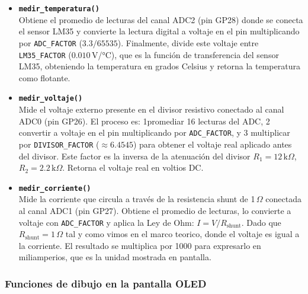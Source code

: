 \documentclass[letterpaper,12pt]{article}
\begin{document}
    \begin{itemize}
        \item \textbf{\texttt{medir\_temperatura()}} \\
        Obtiene el promedio de lecturas del canal ADC2 (pin GP28) donde se conecta el sensor LM35 y convierte la lectura digital a voltaje en el pin multiplicando por \texttt{ADC\_FACTOR} ($3.3/65535$). Finalmente, divide este voltaje entre \texttt{LM35\_FACTOR} ($0.010$\,V/°C), que es la función de transferencia del sensor LM35, obteniendo la temperatura en grados Celsius y retorna la temperatura como flotante.

        \item \textbf{\texttt{medir\_voltaje()}} \\
        Mide el voltaje externo presente en el divisor resistivo conectado al canal ADC0 (pin GP26). El proceso es: 1promediar 16 lecturas del ADC, 2 convertir a voltaje en el pin multiplicando por \texttt{ADC\_FACTOR}, y 3 multiplicar por \texttt{DIVISOR\_FACTOR} ($\approx 6.4545$) para obtener el voltaje real aplicado antes del divisor. Este factor es la inversa de la atenuación del divisor $R_1=12\,\text{k}\Omega$, $R_2=2.2\,\text{k}\Omega$. Retorna el voltaje real en voltios DC.

        \item \textbf{\texttt{medir\_corriente()}} \\
        Mide la corriente que circula a través de la resistencia shunt de 1\,$\Omega$ conectada al canal ADC1 (pin GP27). Obtiene el promedio de lecturas, lo convierte a voltaje con \texttt{ADC\_FACTOR} y aplica la Ley de Ohm: $I = V / R_{\text{shunt}}$. Dado que $R_{\text{shunt}} = 1\,\Omega$ tal y como vimos en el marco teorico, donde el voltaje es igual a la corriente. El resultado se multiplica por 1000 para expresarlo en miliamperios, que es la unidad mostrada en pantalla.
    \end{itemize}

    \subsubsection{Funciones de dibujo en la pantalla OLED}
\end{document}
